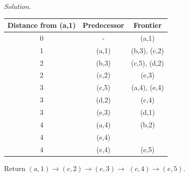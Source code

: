 \documentclass[11pt]{article}
\begin{document}
\begin{enumerate}
\begin{enumerate}
\begin{figure} [H]
        
    
    
    

    
        
    \end{figure}
    \textit{Solution. }
    \begin{center}
      \begin{tabular}{|c|c|c|}
          \hline
          \textbf{Distance from (a,1)} & \textbf{Predecessor} & \textbf{Frontier} \\
          \hline
          0 & - & (a,1) \\
          \hline
          1 & (a,1) & (b,3), (c,2) \\
          \hline
          2 & (b,3) & (c,5), (d,2) \\
          2 & (c,2) & (e,3) \\
          \hline
          3 & (c,5) & (a,4), (e,4) \\
          3 & (d,2) & (c,4) \\
          3 & (e,3) & (d,1) \\
          \hline
          4 & (a,4) & (b,2) \\
          4 & (e,4) &   \\
          4 & (c,4) & (e,5) \\
          \hline
      \end{tabular}
    \end{center}
    Return $(a, 1) \rightarrow(c, 2) \rightarrow(e, 3) \rightarrow$ $(c, 4) \rightarrow(e, 5)$.
    \end{enumerate}



\end{enumerate}
\end{document}
